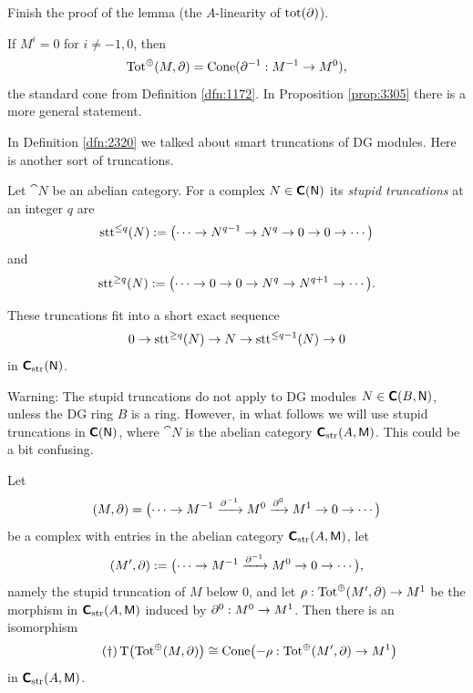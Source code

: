 \begin{exer} \label{exer:4750}
Finish the proof of the lemma (the $A$-linearity of $\operatorname{tot}(\partial)$). 
\end{exer}

\begin{exa} \label{exa:3300}
If $M^i = 0$ for $i \neq -1, 0$, then 
\[ \operatorname{Tot}^{\oplus}(M, \partial) = 
\operatorname{Cone}(\partial^{-1} : M^{-1} \to M^0) , \]
the standard cone from Definition \ref{dfn:1172}.
In Proposition \ref{prop:3305} there is  a more general statement. 
\end{exa}

In Definition \ref{dfn:2320} we talked about smart truncations of DG 
modules. Here is another sort of truncations. 

\begin{dfn} \label{dfn:3066}
Let $\cat{N}$ be an abelian category. 
For a complex $N \in \boldsymbol{\mathsf{C}}(\operatorname{\mathsf{N}})$ its 
{\em stupid truncations}%
%
at an integer $q$ are 
\[ \operatorname{stt}^{\leq q}(N) := 
\bigl( \cdots \to N^{q - 1} \to N^{q} \to 0 \to 0 \to \cdots \bigr) \] 
and%
\[ \operatorname{stt}^{\geq q}(N) := 
\bigl( \cdots \to 0 \to 0 \to N^{q} \to N^{q + 1} \to \cdots \bigr)  . \]
\end{dfn}

These truncations fit into a short exact sequence 
\begin{equation} \label{eqn:2147}
0 \to \operatorname{stt}^{\geq q}(N) \to N \to \operatorname{stt}^{\leq q - 1}(N) \to  0
\end{equation}
in $\boldsymbol{\mathsf{C}}_{\mathrm{str}}(\operatorname{\mathsf{N}})$. 

Warning: The stupid truncations do not apply to DG modules 
$N \in \boldsymbol{\mathsf{C}}(B, \operatorname{\mathsf{N}})$, unless the DG ring $B$ is a ring.   
However, in what follows we will use stupid truncations in 
$\boldsymbol{\mathsf{C}}(\operatorname{\mathsf{N}})$, where 
$\cat{N}$ is the abelian category $\boldsymbol{\mathsf{C}}_{\mathrm{str}}(A, \operatorname{\mathsf{M}})$. 
This could be a bit confusing. 

\begin{prop} \label{prop:3305}
Let 
\[ (M, \partial) =  \bigl( \cdots \to M^{-1} \xrightarrow{\partial^{-1}}
M^{0} \xrightarrow{\partial^{0}} M^{1} \to 0 \to \cdots \bigr) \]
be a complex with entries in the abelian category 
$\boldsymbol{\mathsf{C}}_{\mathrm{str}}(A, \operatorname{\mathsf{M}})$, let 
\[ (M', \partial) :=  \bigl( \cdots \to M^{-1} \xrightarrow{\partial^{-1}}
M^{0} \to 0 \to \cdots \bigr) , \]
namely the stupid truncation of $M$ below $0$, and let 
$\rho : \operatorname{Tot}^{\oplus}(M', \partial) \to M^1$
be the morphism in $\boldsymbol{\mathsf{C}}_{\mathrm{str}}(A, \operatorname{\mathsf{M}})$ induced by
$\partial^{0} : M^{0} \to M^1$. 
Then there is an isomorphism 
\[ \tag{\dag} \operatorname{T} \bigl( \operatorname{Tot}^{\oplus}(M, \partial) \bigr) \cong 
\operatorname{Cone} \bigl( - \rho : \operatorname{Tot}^{\oplus}(M', \partial) \to M^1 \bigr) \]
in $\boldsymbol{\mathsf{C}}_{\mathrm{str}}(A, \operatorname{\mathsf{M}})$. 
\end{prop}

